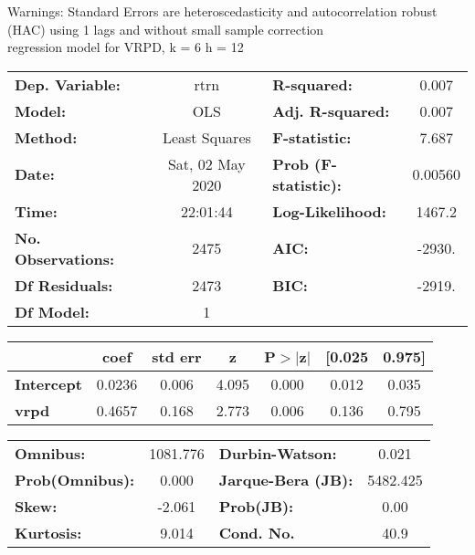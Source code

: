 Warnings: \newline
 [1] Standard Errors are heteroscedasticity and autocorrelation robust (HAC) using 1 lags and without small sample correction\\ 

regression model for VRPD, k = 6 h = 12\begin{center}
\begin{tabular}{lclc}
\toprule
\textbf{Dep. Variable:}    &       rtrn       & \textbf{  R-squared:         } &     0.007   \\
\textbf{Model:}            &       OLS        & \textbf{  Adj. R-squared:    } &     0.007   \\
\textbf{Method:}           &  Least Squares   & \textbf{  F-statistic:       } &     7.687   \\
\textbf{Date:}             & Sat, 02 May 2020 & \textbf{  Prob (F-statistic):} &  0.00560    \\
\textbf{Time:}             &     22:01:44     & \textbf{  Log-Likelihood:    } &    1467.2   \\
\textbf{No. Observations:} &        2475      & \textbf{  AIC:               } &    -2930.   \\
\textbf{Df Residuals:}     &        2473      & \textbf{  BIC:               } &    -2919.   \\
\textbf{Df Model:}         &           1      & \textbf{                     } &             \\
\bottomrule
\end{tabular}
\begin{tabular}{lcccccc}
                   & \textbf{coef} & \textbf{std err} & \textbf{z} & \textbf{P$> |$z$|$} & \textbf{[0.025} & \textbf{0.975]}  \\
\midrule
\textbf{Intercept} &       0.0236  &        0.006     &     4.095  &         0.000        &        0.012    &        0.035     \\
\textbf{vrpd}      &       0.4657  &        0.168     &     2.773  &         0.006        &        0.136    &        0.795     \\
\bottomrule
\end{tabular}
\begin{tabular}{lclc}
\textbf{Omnibus:}       & 1081.776 & \textbf{  Durbin-Watson:     } &    0.021  \\
\textbf{Prob(Omnibus):} &   0.000  & \textbf{  Jarque-Bera (JB):  } & 5482.425  \\
\textbf{Skew:}          &  -2.061  & \textbf{  Prob(JB):          } &     0.00  \\
\textbf{Kurtosis:}      &   9.014  & \textbf{  Cond. No.          } &     40.9  \\
\bottomrule
\end{tabular}
\end{center}

